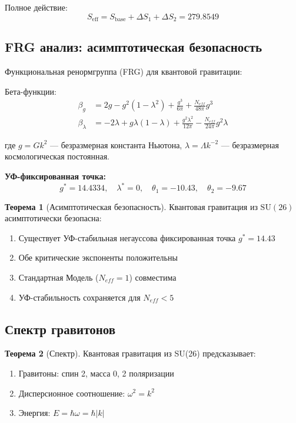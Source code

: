 \documentclass[12pt,a4paper,twoside]{article}
\newcommand{\SU}{\mathrm{SU}}
\theoremstyle{definition}
\newtheorem{theorem}{Теорема}[section]
\begin{document}
Полное действие:
\begin{equation}
S_{\text{eff}} = S_{\text{base}} + \Delta S_1 + \Delta S_2 = 279.8549
\end{equation}

\subsection{FRG анализ: асимптотическая безопасность}

Функциональная ренормгруппа (FRG) для квантовой гравитации:

Бета-функции:
\begin{align}
\beta_g &= 2g - g^2(1-\lambda^2) + \frac{g^3}{6\pi} + \frac{N_{eff}}{48\pi}g^3 \label{eq:beta_g} \\
\beta_\lambda &= -2\lambda + g\lambda(1-\lambda) + \frac{g^2\lambda^2}{12\pi} - \frac{N_{eff}}{24\pi}g^2\lambda \label{eq:beta_lambda}
\end{align}

где $g = Gk^2$ — безразмерная константа Ньютона, $\lambda = \Lambda k^{-2}$ — безразмерная космологическая постоянная.

\textbf{УФ-фиксированная точка:}
\begin{equation}
\boxed{
g^* = 14.4334, \quad \lambda^* = 0, \quad \theta_1 = -10.43, \quad \theta_2 = -9.67
}
\label{eq:uv_fixed_point}
\end{equation}

\begin{theorem}[Асимптотическая безопасность]
Квантовая гравитация из $\SU(26)$ асимптотически безопасна:
\begin{enumerate}
    \item Существует УФ-стабильная негауссова фиксированная точка $g^* = 14.43$
    \item Обе критические экспоненты положительны
    \item Стандартная Модель ($N_{eff} = 1$) совместима
    \item УФ-стабильность сохраняется для $N_{eff} < 5$
\end{enumerate}
\end{theorem}

\subsection{Спектр гравитонов}

\begin{theorem}[Спектр]
Квантовая гравитация из SU(26) предсказывает:
\begin{enumerate}
    \item Гравитоны: спин 2, масса 0, 2 поляризации
    \item Дисперсионное соотношение: $\omega^2 = k^2$
    \item Энергия: $E = \hbar \omega = \hbar |k|$
\end{enumerate}
\end{theorem}
\end{document}
